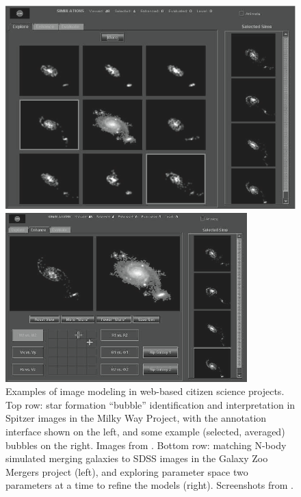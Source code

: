 \documentclass{ar2e}
\begin{document}
\begin{figure}[t]
\begin{minipage}{\linewidth}
  \begin{minipage}{0.48\linewidth}
    \centering\includegraphics[width=\linewidth]{figs/HolincheckEtal2010_comparing.png}
  \end{minipage}\hfill
  \begin{minipage}{0.48\linewidth}
    \centering\includegraphics[width=\linewidth]{figs/HolincheckEtal2010_enhancing.png}
  \end{minipage}\hfill
\end{minipage}
\caption{Examples of image modeling in web-based citizen science projects. Top
row: star formation ``bubble'' identification and interpretation in Spitzer
images in the Milky Way Project, with the annotation interface shown on the
left, and some example (selected, averaged) bubbles on the right. Images from
\citet{SimpsonEtal2012}. Bottom row: matching N-body simulated merging
galaxies to SDSS images in the Galaxy Zoo Mergers project (left), and
exploring parameter space two parameters at a time to refine the models
(right). Screenshots from \citet{HolincheckEtal2010}.}
\label{fig:modeling}
\end{figure}
\end{document}
